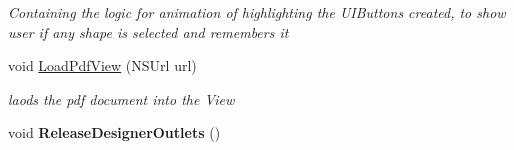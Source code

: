 \begin{DoxyCompactItemize}
\begin{DoxyCompactList}\small\item\em Containing the logic for animation of highlighting the U\+I\+Buttons created, to show user if any shape is selected and remembers it \end{DoxyCompactList}\item 
void \hyperlink{class_ramboell_1_1i_o_s_1_1_pdf_view_controller_a29c0a1aafda725e0bc0d5f8d5c0ba971}{Load\+Pdf\+View} (N\+S\+Url url)
\begin{DoxyCompactList}\small\item\em laods the pdf document into the View \end{DoxyCompactList}\item 
\mbox{\label{class_ramboell_1_1i_o_s_1_1_pdf_view_controller_a90ef9035f083d5bbe30d49f28c2a2542}} 
void {\bfseries Release\+Designer\+Outlets} ()
\end{DoxyCompactItemize}
